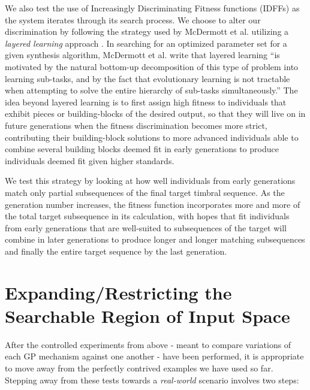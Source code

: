 \documentclass[12pt]{report} 	%
\numberwithin{figure}{chapter}
\numberwithin{table}{chapter}
\numberwithin{equation}{chapter}
\begin{document}
\begin{flushleft}
We also test the use of Increasingly Discriminating Fitness functions (IDFFs) as the system iterates through its search process. We choose to alter our discrimination by following the strategy used by McDermott et al. utilizing a \textit{layered learning} approach \cite[p. 3]{McDermott:2006jd}. In searching for an optimized parameter set for a given synthesis algorithm, McDermott et al. write that layered learning ``is motivated by the natural bottom-up decomposition of this type of problem into learning sub-tasks, and by the fact that evolutionary learning is not tractable when attempting to solve the entire hierarchy of sub-tasks simultaneously.'' The idea beyond layered learning is to first assign high fitness to individuals that exhibit pieces or building-blocks of the desired output, so that they will live on in future generations when the fitness discrimination becomes more strict, contributing their building-block solutions to more advanced individuals able to combine several building blocks deemed fit in early generations to produce individuals deemed fit given higher standards.

We test this strategy by looking at how well individuals from early generations match only partial subsequences of the final target timbral sequence. As the generation number increases, the fitness function incorporates more and more of the total target subsequence in its calculation, with hopes that fit individuals from early generations that are well-suited to subsequences of the target will combine in later generations to produce longer and longer matching subsequences and finally the entire target sequence by the last generation.

\section{Expanding/Restricting the Searchable Region of Input Space}

After the controlled experiments from above - meant to compare variations of each GP mechanism against one another - have been performed, it is appropriate to move away from the perfectly contrived examples we have used so far. Stepping away from these tests towards a \textit{real-world} scenario involves two steps:


\end{flushleft}
\end{document}
